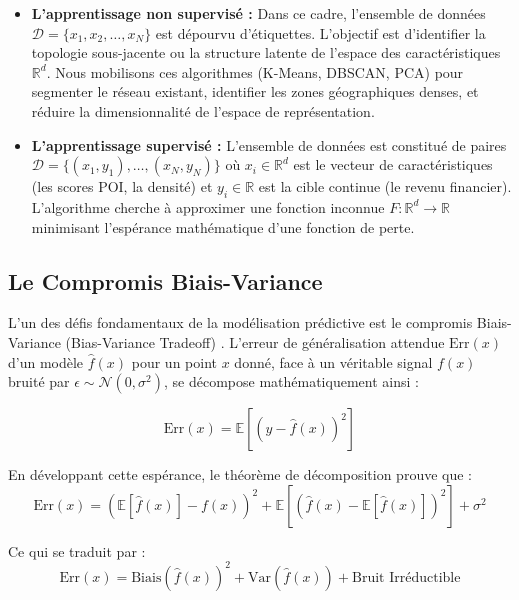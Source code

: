 \documentclass[11pt,a4paper,twoside]{report}
\begin{document}
\begin{itemize}[leftmargin=1.2cm]
    \item \textbf{L'apprentissage non supervisé :} Dans ce cadre, l'ensemble de données $\mathcal{D} = \{x_1, x_2, \dots, x_N\}$ est dépourvu d'étiquettes. L'objectif est d'identifier la topologie sous-jacente ou la structure latente de l'espace des caractéristiques $\mathbb{R}^d$. Nous mobilisons ces algorithmes (K-Means, DBSCAN, PCA) pour segmenter le réseau existant, identifier les zones géographiques denses, et réduire la dimensionnalité de l'espace de représentation.
    \item \textbf{L'apprentissage supervisé :} L'ensemble de données est constitué de paires $\mathcal{D} = \{(x_1, y_1), \dots, (x_N, y_N)\}$ où $x_i \in \mathbb{R}^d$ est le vecteur de caractéristiques (les scores POI, la densité) et $y_i \in \mathbb{R}$ est la cible continue (le revenu financier). L'algorithme cherche à approximer une fonction inconnue $F: \mathbb{R}^d \rightarrow \mathbb{R}$ minimisant l'espérance mathématique d'une fonction de perte.
\end{itemize}

\subsection{Le Compromis Biais-Variance}

L'un des défis fondamentaux de la modélisation prédictive est le compromis Biais-Variance (Bias-Variance Tradeoff) \cite{hastie2009}. L'erreur de généralisation attendue $\text{Err}(x)$ d'un modèle $\hat{f}(x)$ pour un point $x$ donné, face à un véritable signal $f(x)$ bruité par $\epsilon \sim \mathcal{N}(0, \sigma^2)$, se décompose mathématiquement ainsi :

\begin{equation}
\text{Err}(x) = \mathbb{E}\left[ (y - \hat{f}(x))^2 \right]
\end{equation}

En développant cette espérance, le théorème de décomposition prouve que :
\begin{equation}
\text{Err}(x) = \left( \mathbb{E}[\hat{f}(x)] - f(x) \right)^2 + \mathbb{E}\left[ (\hat{f}(x) - \mathbb{E}[\hat{f}(x)])^2 \right] + \sigma^2
\end{equation}

Ce qui se traduit par :
\begin{equation}
\text{Err}(x) = \text{Biais}(\hat{f}(x))^2 + \text{Var}(\hat{f}(x)) + \text{Bruit Irréductible}
\end{equation}
\end{document}
